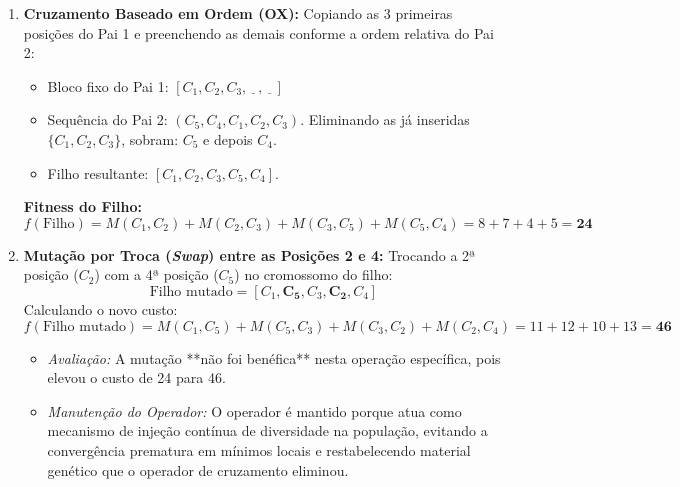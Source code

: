 \begin{enumerate}[label=(\alph*)]
    \item \textbf{Cruzamento Baseado em Ordem (OX):}
    Copiando as 3 primeiras posições do Pai 1 e preenchendo as demais conforme a ordem relativa do Pai 2:
    \begin{itemize}
        \item Bloco fixo do Pai 1: $[C_1, C_2, C_3, \underline{\phantom{C}}, \underline{\phantom{C}}]$
        \item Sequência do Pai 2: $(C_5, C_4, C_1, C_2, C_3)$. Eliminando as já inseridas $\{C_1, C_2, C_3\}$, sobram: $C_5$ e depois $C_4$.
        \item Filho resultante: $[C_1, C_2, C_3, C_5, C_4]$.
    \end{itemize}
    \textbf{Fitness do Filho:}
    \begin{equation*}
        f(\text{Filho}) = M(C_1, C_2) + M(C_2, C_3) + M(C_3, C_5) + M(C_5, C_4) = 8 + 7 + 4 + 5 = \mathbf{24}
    \end{equation*}

    \item \textbf{Mutação por Troca (\textit{Swap}) entre as Posições 2 e 4:}
    Trocando a 2ª posição ($C_2$) com a 4ª posição ($C_5$) no cromossomo do filho:
    \begin{equation*}
        \text{Filho mutado} = [C_1, \mathbf{C_5}, C_3, \mathbf{C_2}, C_4]
    \end{equation*}
    Calculando o novo custo:
    \begin{equation*}
        f(\text{Filho mutado}) = M(C_1, C_5) + M(C_5, C_3) + M(C_3, C_2) + M(C_2, C_4) = 11 + 12 + 10 + 13 = \mathbf{46}
    \end{equation*}
    \begin{itemize}
        \item \textit{Avaliação:} A mutação **não foi benéfica** nesta operação específica, pois elevou o custo de 24 para 46.
        \item \textit{Manutenção do Operador:} O operador é mantido porque atua como mecanismo de injeção contínua de diversidade na população, evitando a convergência prematura em mínimos locais e restabelecendo material genético que o operador de cruzamento eliminou.
    \end{itemize}


\end{enumerate}
